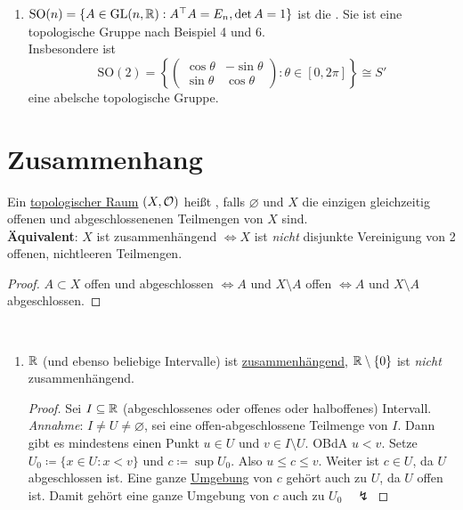 \begin{example}
\begin{enumerate}
    \item $ \text{SO}(n) = \{ A \in \text{GL}(n,\mathbb{R}) : A^\top A = E_n, \det A = 1 \} $ ist die . Sie ist eine topologische Gruppe nach Beispiel 4 und 6. \\
      Insbesondere ist
      \begin{equation*}
        \text{SO}(2) = \left\{ \begin{pmatrix}
          \cos \theta & -\sin \theta \\
          \sin \theta & \cos \theta
        \end{pmatrix} : \theta \in [0, 2\pi] \right\} \cong S'
      \end{equation*}
      eine abelsche topologische Gruppe.
  \end{enumerate}
\end{example}

\section{Zusammenhang}

\begin{definition}[Zusammenhängend]
  \label{def:zusammenhaengend}
  Ein \hyperref[def:topologie]{topologischer Raum} $ (X, \mathcal{O}) $ heißt , falls $ \varnothing $ und $ X $ die einzigen gleichzeitig offenen und abgeschlossenenen Teilmengen von $ X $ sind. \\
  \textbf{Äquivalent}: $ X $ ist zusammenhängend $ \Leftrightarrow X $ ist \emph{nicht} disjunkte Vereinigung von 2 offenen, nichtleeren Teilmengen.
  \begin{proof}
    $ A \subset X $ offen und abgeschlossen $ \Leftrightarrow A $ und $ X \setminus A $ offen $ \Leftrightarrow A $ und $ X \setminus A $ abgeschlossen.
  \end{proof}
\end{definition}

\begin{example}[Zusammenhang]
  \
  \begin{enumerate}
    \item $ \mathbb{R} $ (und ebenso beliebige Intervalle) ist \hyperref[def:zusammenhaengend]{zusammenhängend}, $ \mathbb{R} \setminus \{ 0 \} $ ist \emph{nicht} zusammenhängend.
    \begin{proof}
      Sei $ I \subseteq \mathbb{R} $ (abgeschlossenes oder offenes oder halboffenes) Intervall. \\
      \emph{Annahme}: $ I \neq U \neq \varnothing $, sei eine offen-abgeschlossene Teilmenge von $ I $. Dann gibt es mindestens einen Punkt $ u \in U $ und $ v \in I \setminus U $. OBdA $ u < v $. Setze $ U_0 \coloneqq \{ x \in U : x < v \} $ und $ c \coloneqq \sup U_0 $. Also $ u \leq c \leq v $. Weiter ist $ c \in U $, da $ U $ abgeschlossen ist. Eine ganze \hyperref[def:umgebung]{Umgebung} von $ c $ gehört auch zu $ U $, da $ U $ offen ist. Damit gehört eine ganze Umgebung von $ c $ auch zu $ U_0 \quad \lightning $
    \end{proof}
  \end{enumerate}
\end{example}

